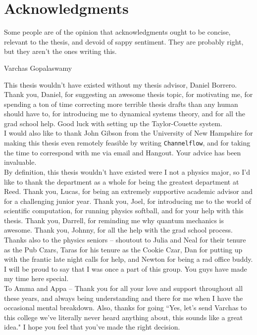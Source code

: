     \chapter*{Acknowledgments}
	\epigraph{Some people are of the opinion that acknowledgments ought to be concise, relevant to the thesis, and devoid of sappy sentiment. They are probably right, but they aren't the ones writing this.}{Varchas Gopalaswamy}

This thesis wouldn't have existed without my thesis advisor, Daniel Borrero. Thank you, Daniel, for suggesting an awesome thesis topic, for motivating me, for spending a ton of time correcting more terrible thesis drafts than any human should have to, for introducing me to dynamical systems theory, and for all the grad school help. Good luck with setting up the Taylor-Couette system.\\

I would also like to thank John Gibson from the University of New Hampshire for making this thesis even remotely feasible by writing {\tt Channelflow}, and for taking the time to correspond with me via email and Hangout. Your advice has been invaluable. \\
 
By definition, this thesis wouldn't have existed were I not a physics major, so I'd like to thank the department as a whole for being the greatest department at Reed. Thank you, Lucas, for being an extremely supportive academic advisor and for a  challenging junior year. Thank you, Joel, for introducing me to the world of scientific computation, for running physics softball, and for your help with this thesis. Thank you, Darrell, for reminding me why quantum mechanics is awesome. Thank you, Johnny, for all the help with the grad school process. Thanks also to the physics seniors -- shoutout to Julia and Neal for their tenure as the Pub Czars, Taras for his tenure as the Cookie Czar, Dan for putting up with the frantic late night calls for help, and Newton for being a rad office buddy.  I will be proud to say that I was once a part of this group. You guys have made my time here special. \\

To Amma and Appa -- Thank you for all your love and support throughout all these years, and always being understanding and there for me when I have the occasional mental breakdown. Also, thanks for going ``Yes, let's send Varchas to this college we've literally never heard anything about, this sounds like a great idea." I hope you feel that you've made the right decision. 

